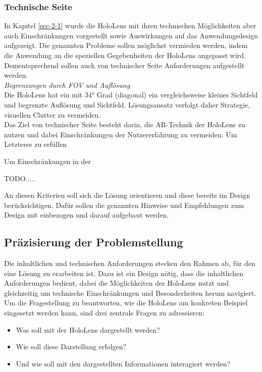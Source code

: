 \subsubsection{Technische Seite}
In Kapitel \ref{sec-2-1} wurde die HoloLens mit ihren technischen Möglichkeiten aber auch Einschränkungen vorgestellt sowie Auswirkungen auf das Anwendungsdesign aufgezeigt. Die genannten Probleme sollen möglichst vermieden werden, indem die Anwendung an die speziellen Gegebenheiten der HoloLens angepasst wird. Dementsprechend sollen auch von technischer Seite Anforderungen aufgestellt werden.\\

\textit{Begrenzungen durch FOV und Auflösung}\\
Die HoloLens hat ein mit 34° Grad (diagonal) ein vergleichsweise kleines Sichtfeld und  begrenzte Auflösung und Sichtfeld. Lösungsansatz verfolgt daher Strategie, visuellen Clutter zu vermeiden. \\

Das Ziel von technischer Seite besteht darin, die AR-Technik der HoloLens zu nutzen und dabei Einschränkungen der Nutzererfahrung zu vermeiden. Um Letzteres zu erfüllen 

Um Einschränkungen in der

TODO.....

An diesen Kriterien soll sich die Lösung orientieren und diese bereits im Design berücksichtigen. Dafür sollen die genannten Hinweise und Empfehlungen zum Design mit einbezogen und darauf aufgebaut werden.\\

\subsection{Präzisierung der Problemstellung}
\label{sec-3-2}
Die inhaltlichen und technischen Anforderungen stecken den Rahmen ab, für den eine Lösung zu erarbeiten ist. Dazu ist ein Design nötig, dass die inhaltlichen Anforderungen bedient, dabei die Möglichkeiten der HoloLens nutzt und gleichzeitig um technische Einschränkungen und Besonderheiten herum navigiert. Um die Fragestellung zu beantworten, wie die HoloLens am konkreten Beispiel eingesetzt werden kann, sind drei zentrale Fragen zu adressieren:
\begin{itemize}
	\setlength{\itemsep}{-5pt}
	\item Was soll mit der HoloLens dargestellt werden?
	\item Wie soll diese Darstellung erfolgen?
	\item Und wie soll mit den dargestellten Informationen interagiert werden?
\end{itemize}


